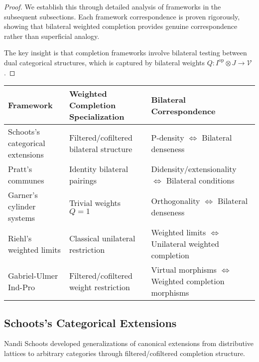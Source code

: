 \documentclass[11pt]{article}
\theoremstyle{plain}
\theoremstyle{definition}
\theoremstyle{remark}
\newcommand{\V}{\mathcal{V}}
\newcommand{\op}{\mathrm{op}}
\begin{document}
\begin{proof}
We establish this through detailed analysis of frameworks in the subsequent subsections. Each framework correspondence is proven rigorously, showing that bilateral weighted completion provides genuine correspondence rather than superficial analogy.

The key insight is that completion frameworks involve bilateral testing between dual categorical structures, which is captured by bilateral weights $Q : I^{\op} \otimes J \to \V$.
\end{proof}

\begin{center}
\renewcommand{\arraystretch}{1.4}
\begin{longtable}{@{}p{3.5cm}p{3.5cm}p{7cm}@{}}
\toprule
\textbf{Framework} & \textbf{Weighted Completion Specialization} & \textbf{Bilateral Correspondence} \\
\midrule
Schoots's categorical extensions \cite{schoots2015generalising} & Filtered/cofiltered bilateral structure & P-density $\Leftrightarrow$ Bilateral denseness \\
\addlinespace
Pratt's communes \cite{pratt2010communes} & Identity bilateral pairings & Didensity/extensionality $\Leftrightarrow$ Bilateral conditions \\
\addlinespace
Garner's cylinder systems \cite{garner2018isbell} & Trivial weights $Q = 1$ & Orthogonality $\Leftrightarrow$ Bilateral denseness \\
\addlinespace
Riehl's weighted limits \cite{riehl2008weighted} & Classical unilateral restriction & Weighted limits $\Leftrightarrow$ Unilateral weighted completion \\
\addlinespace
Gabriel-Ulmer Ind-Pro \cite{gabriel1971lokal} & Filtered/cofiltered weight restriction & Virtual morphisms $\Leftrightarrow$ Weighted completion morphisms \\
\bottomrule
\end{longtable}
\end{center}

\subsection{Schoots's Categorical Extensions}

Nandi Schoots \cite{schoots2015generalising} developed generalizations of canonical extensions from distributive lattices to arbitrary categories through filtered/cofiltered completion structure.
\end{document}
